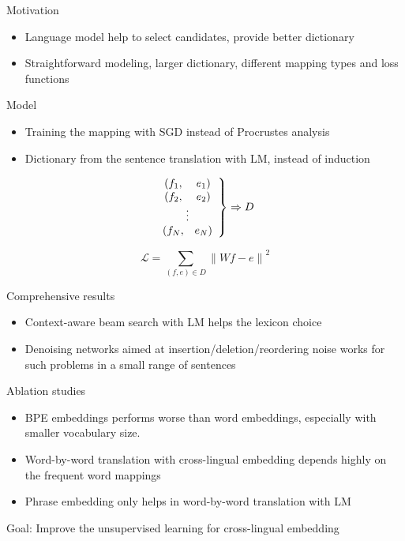\documentclass[11pt, a4paper, landscape]{article}
\begin{document}
\NewPage
{}
\vfill
Motivation
\begin{itemize}
	\item Language model help to select candidates, provide better dictionary
	\item Straightforward modeling, larger dictionary, different mapping types and loss functions\\
\end{itemize}
Model
\begin{itemize}
	\item Training the mapping with SGD instead of Procrustes analysis
	\item Dictionary from the sentence translation with LM, instead of induction
		


\end{itemize}

\begin{minipage}[b]{0.5\textwidth}
			\[ 
	\left. \begin{array}{c c} 
	(f_1,& e_1)\\
	(f_2,& e_2)\\
	\multicolumn{2}{c}{\vdots}\\
	(f_N,& e_N)
	\end{array} \right\} 
	\Rightarrow D
	\]
	
\end{minipage}
\begin{minipage}[b]{0.3\textwidth}
\[\mathcal{L} = \sum_{(f,e)\in D} {\lVert Wf - e \rVert}^2  \]
\end{minipage}

\vfill

	\NewPage
	\vfill
	Comprehensive results
	\begin{itemize}
		\item Context-aware beam search with LM helps the lexicon choice
		\item Denoising networks aimed at insertion/deletion/reordering noise works for such problems in a small range of sentences\\
	\end{itemize}
	Ablation studies
	\begin{itemize}
		\item BPE embeddings performs worse than word embeddings, especially with smaller
		vocabulary size.
		\item Word-by-word translation with cross-lingual
embedding depends highly on the frequent word mappings
		\item Phrase embedding only helps in word-by-word translation with LM
	\end{itemize}
	\vfill
	\NewPage
	\vfill
	Goal: Improve the unsupervised learning for cross-lingual embedding
\end{document}
